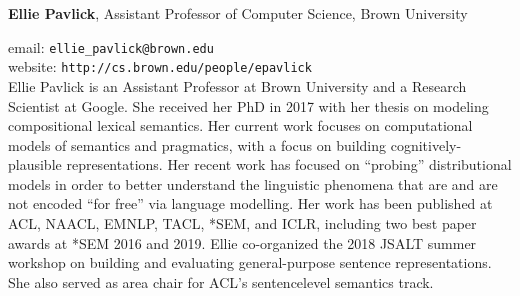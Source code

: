 {{\bfseries Ellie Pavlick}, Assistant Professor of Computer
Science, Brown University

email: {\tt ellie\_pavlick@brown.edu}  \\
website: {\tt http://cs.brown.edu/people/epavlick} \\
Ellie Pavlick is an Assistant Professor at Brown
University and a Research Scientist at Google.
She received her PhD in 2017 with her thesis on
modeling compositional lexical semantics. Her
current work focuses on computational models of
semantics and pragmatics, with a focus on building cognitively-plausible representations. Her recent work has focused on “probing” distributional
models in order to better understand the linguistic
phenomena that are and are not encoded “for free”
via language modelling. Her work has been published at ACL, NAACL, EMNLP, TACL, *SEM,
and ICLR, including two best paper awards at *SEM 2016 and 2019. Ellie co-organized the 2018
JSALT summer workshop on building and evaluating general-purpose sentence representations.
She also served as area chair for ACL’s sentencelevel semantics track.
  
}
